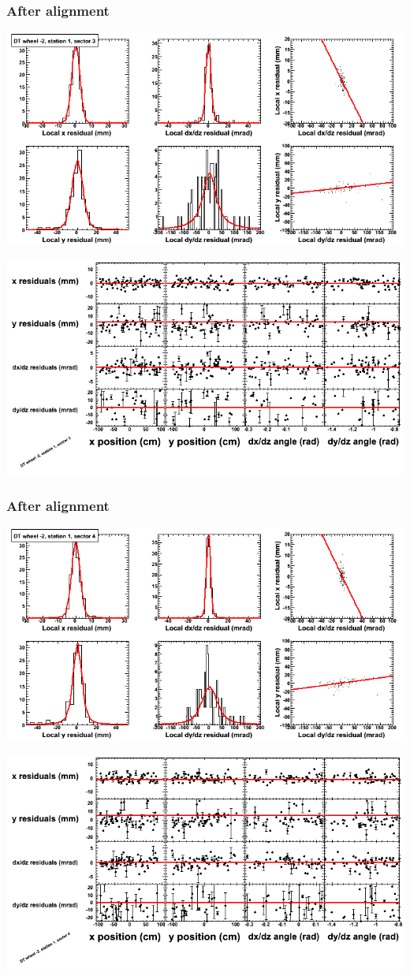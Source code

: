 \documentclass[compress]{beamer}
\begin{document}
\begin{frame}
\frametitle{After alignment}
\includegraphics[width=0.7\linewidth]{NOV4_fitfunctions/MBwhAst1sec03_bellcurves.png}

\includegraphics[width=0.7\linewidth]{NOV4_fitfunctions/MBwhAst1sec03_polynomials.png}
\end{frame}

\begin{frame}
\frametitle{After alignment}
\includegraphics[width=0.7\linewidth]{NOV4_fitfunctions/MBwhAst1sec04_bellcurves.png}

\includegraphics[width=0.7\linewidth]{NOV4_fitfunctions/MBwhAst1sec04_polynomials.png}
\end{frame}
\end{document}
